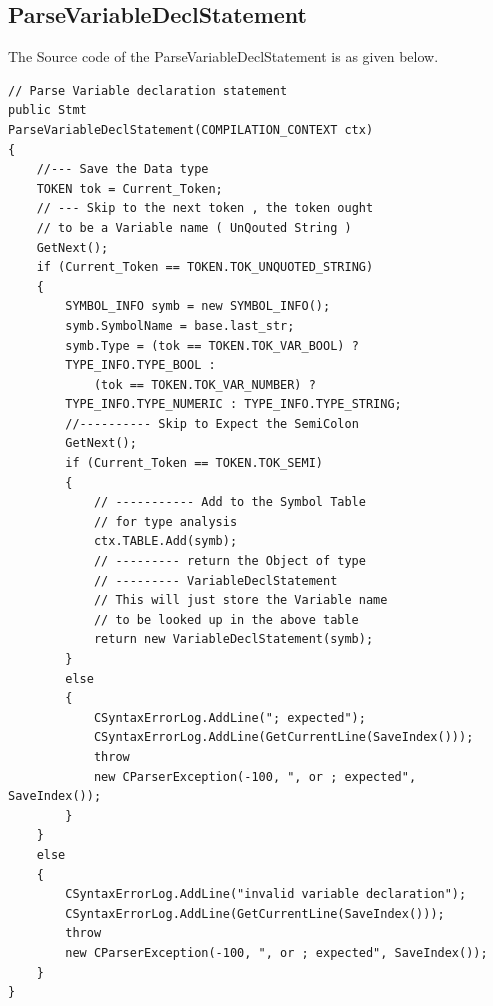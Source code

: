 \subsection{ParseVariableDeclStatement}
The Source code of the ParseVariableDeclStatement is as given below.
\lstset{style=csharp}
\begin{lstlisting}
// Parse Variable declaration statement
public Stmt 
ParseVariableDeclStatement(COMPILATION_CONTEXT ctx)
{
	//--- Save the Data type
	TOKEN tok = Current_Token;
	// --- Skip to the next token , the token ought
	// to be a Variable name ( UnQouted String )
	GetNext();
	if (Current_Token == TOKEN.TOK_UNQUOTED_STRING)
	{
		SYMBOL_INFO symb = new SYMBOL_INFO();
		symb.SymbolName = base.last_str;
		symb.Type = (tok == TOKEN.TOK_VAR_BOOL) ?
		TYPE_INFO.TYPE_BOOL : 
			(tok == TOKEN.TOK_VAR_NUMBER) ?
		TYPE_INFO.TYPE_NUMERIC : TYPE_INFO.TYPE_STRING;
		//---------- Skip to Expect the SemiColon
		GetNext();
		if (Current_Token == TOKEN.TOK_SEMI)
		{
			// ----------- Add to the Symbol Table
			// for type analysis
			ctx.TABLE.Add(symb);
			// --------- return the Object of type
			// --------- VariableDeclStatement
			// This will just store the Variable name
			// to be looked up in the above table
			return new VariableDeclStatement(symb);
		}
		else
		{
			CSyntaxErrorLog.AddLine("; expected");
			CSyntaxErrorLog.AddLine(GetCurrentLine(SaveIndex()));
			throw 
			new CParserException(-100, ", or ; expected", SaveIndex());
		}
	}
	else
	{
		CSyntaxErrorLog.AddLine("invalid variable declaration");
		CSyntaxErrorLog.AddLine(GetCurrentLine(SaveIndex()));
		throw  
		new CParserException(-100, ", or ; expected", SaveIndex());
	}
}
\end{lstlisting}
